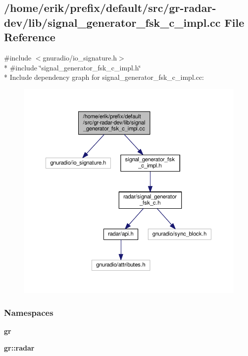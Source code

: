 \subsection{/home/erik/prefix/default/src/gr-\/radar-\/dev/lib/signal\+\_\+generator\+\_\+fsk\+\_\+c\+\_\+impl.cc File Reference}
\label{signal__generator__fsk__c__impl_8cc}
{\ttfamily \#include $<$gnuradio/io\+\_\+signature.\+h$>$}\\*
{\ttfamily \#include \char`\"{}signal\+\_\+generator\+\_\+fsk\+\_\+c\+\_\+impl.\+h\char`\"{}}\\*
Include dependency graph for signal\+\_\+generator\+\_\+fsk\+\_\+c\+\_\+impl.\+cc\+:
\nopagebreak
\begin{figure}[H]
\begin{center}
\leavevmode
\includegraphics[width=350pt]{d5/d46/signal__generator__fsk__c__impl_8cc__incl}
\end{center}
\end{figure}
\subsubsection*{Namespaces}
\begin{DoxyCompactItemize}
\item 
 {\bf gr}
\item 
 {\bf gr\+::radar}
\end{DoxyCompactItemize}
